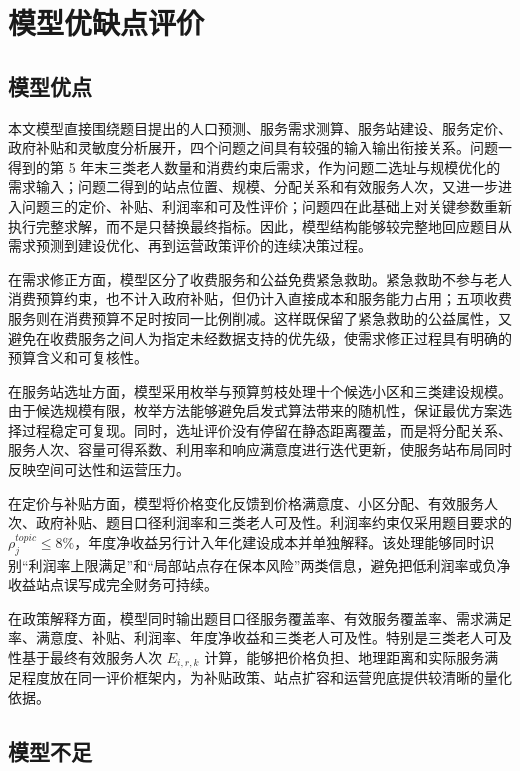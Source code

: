 \section{模型优缺点评价}

\subsection{模型优点}

本文模型直接围绕题目提出的人口预测、服务需求测算、服务站建设、服务定价、政府补贴和灵敏度分析展开，四个问题之间具有较强的输入输出衔接关系。问题一得到的第 5 年末三类老人数量和消费约束后需求，作为问题二选址与规模优化的需求输入；问题二得到的站点位置、规模、分配关系和有效服务人次，又进一步进入问题三的定价、补贴、利润率和可及性评价；问题四在此基础上对关键参数重新执行完整求解，而不是只替换最终指标。因此，模型结构能够较完整地回应题目从需求预测到建设优化、再到运营政策评价的连续决策过程。

在需求修正方面，模型区分了收费服务和公益免费紧急救助。紧急救助不参与老人消费预算约束，也不计入政府补贴，但仍计入直接成本和服务能力占用；五项收费服务则在消费预算不足时按同一比例削减。这样既保留了紧急救助的公益属性，又避免在收费服务之间人为指定未经数据支持的优先级，使需求修正过程具有明确的预算含义和可复核性。

在服务站选址方面，模型采用枚举与预算剪枝处理十个候选小区和三类建设规模。由于候选规模有限，枚举方法能够避免启发式算法带来的随机性，保证最优方案选择过程稳定可复现。同时，选址评价没有停留在静态距离覆盖，而是将分配关系、服务人次、容量可得系数、利用率和响应满意度进行迭代更新，使服务站布局同时反映空间可达性和运营压力。

在定价与补贴方面，模型将价格变化反馈到价格满意度、小区分配、有效服务人次、政府补贴、题目口径利润率和三类老人可及性。利润率约束仅采用题目要求的 $\rho_j^{topic}\le8\%$，年度净收益另行计入年化建设成本并单独解释。该处理能够同时识别“利润率上限满足”和“局部站点存在保本风险”两类信息，避免把低利润率或负净收益站点误写成完全财务可持续。

在政策解释方面，模型同时输出题目口径服务覆盖率、有效服务覆盖率、需求满足率、满意度、补贴、利润率、年度净收益和三类老人可及性。特别是三类老人可及性基于最终有效服务人次 $E_{i,r,k}$ 计算，能够把价格负担、地理距离和实际服务满足程度放在同一评价框架内，为补贴政策、站点扩容和运营兜底提供较清晰的量化依据。

\subsection{模型不足}

